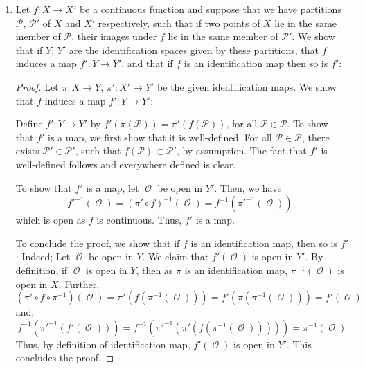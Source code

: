 \documentclass{book}
\DeclareMathOperator*{\Ocal}{\mathcal{O}}
\begin{document}
\begin{enumerate}[(1)]
    \item Let $f: X \rightarrow X'$ be a continuous function and suppose that we have partitions $\mathscr{P}$, $\mathscr{P}'$ of $X$ and $X'$ respectively, such that if two points of $X$ lie in the same member of $\mathcal{P}$, their images under $f$ lie in the same member of $\mathscr{P}'$. We show that if $Y$, $Y'$ are the identification spaces given by these partitions, that $f$ induces a map $f': Y \rightarrow Y'$, and that if $f$ is an identification map then so is $f'$: 
        \begin{proof} Let $\pi : X \rightarrow Y$, $\pi': X' \rightarrow Y'$ be the given identification maps. We show that $f$ induces a map $f': Y \rightarrow Y'$: 
            \par Define $f': Y \rightarrow Y'$ by $f'(\pi(\mathcal{P})) = \pi' (f(\mathcal{P}))$, for all $\mathcal{P} \in \mathscr{P}$. To show that $f'$ is a map, we first show that it is well-defined. For all $\mathcal{P} \in \mathscr{P}$, there exists $\mathcal{P}' \in \mathscr{P}'$, such that $f(\mathcal{P}) \subset \mathcal{P}'$, by assumption. The fact that $f'$ is well-defined follows and everywhere defined is clear. 
            \par To show that $f'$ is a map, let $\Ocal$ be open in $Y'$. Then, we have 
            \[f'^{-1}(\Ocal) = (\pi' \circ f)^{-1}(\Ocal) = f^{-1}(\pi'^{-1}(\Ocal)),\]
            which is open as $f$ is continuous. Thus, $f'$ is a map. 
            \par To conclude the proof, we show that if $f$ is an identification map, then so is $f'$: Indeed; Let $\Ocal$ be open in $Y$. We claim that $f'(\Ocal)$ is open in $Y'$. By definition, if $\Ocal$ is open in $Y$, 
            then as $\pi$ is an identification map, $\pi^{-1}(\Ocal)$ is open in $X$. Further, 
            \[(\pi' \circ f \circ \pi^{-1})(\Ocal) = \pi'(f(\pi^{-1}(\Ocal))) = f'(\pi(\pi^{-1}(\Ocal))) = f'(\Ocal) \]
            and, 
            \[f^{-1}(\pi'^{-1}(f'(\Ocal))) = f^{-1}(\pi'^{-1}(\pi'(f(\pi^{-1}(\Ocal))))) = \pi^{-1}(\Ocal) \]
            Thus, by definition of identification map, $f'(\Ocal)$ is open in $Y'$. This concludes the proof.
        \end{proof}


\end{enumerate}
\end{document}
